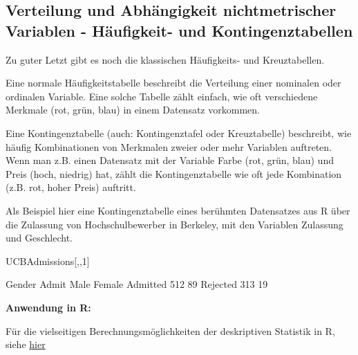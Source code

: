 \documentclass[a4paper,twoside]{tufte-book}\usepackage[]{graphicx}\usepackage[]{color}
\begin{document}
\subsection{Verteilung und Abhängigkeit nichtmetrischer Variablen - Häufigkeit- und Kontingenztabellen}

Zu guter Letzt gibt es noch die klassischen Häufigkeits- und Kreuztabellen.

Eine normale Häufigkeitstabelle beschreibt die Verteilung einer nominalen oder ordinalen Variable. Eine solche Tabelle zählt einfach, wie oft verschiedene Merkmale (rot, grün, blau) in einem Datensatz vorkommen. 

Eine Kontingenztabelle (auch: Kontingenztafel oder Kreuztabelle) beschreibt, wie häufig Kombinationen von Merkmalen zweier oder mehr Variablen auftreten. Wenn man z.B. einen Datensatz mit der Variable Farbe (rot, grün, blau) und Preis (hoch, niedrig) hat, zählt die Kontingenztabelle wie oft jede Kombination (z.B. rot, hoher Preis) auftritt. 

Als Beispiel hier eine Kontingenztabelle eines berühmten Datensatzes aus R über die Zulassung von Hochschulbewerber in Berkeley, mit den Variablen Zulassung und Geschlecht. 

\begin{Schunk}
\begin{Sinput}
UCBAdmissions[,,1]
\end{Sinput}
\begin{Soutput}
          Gender
Admit      Male Female
  Admitted  512     89
  Rejected  313     19
\end{Soutput}
\end{Schunk}


\vspace{1cm}
\begin{fullwidth}
\begin{mdframed}[backgroundcolor=black!10,rightline=false,leftline=false]
    
\textbf{Anwendung in R:} 

Für die vielseitigen Berechnungsmöglichkeiten der deskriptiven Statistik in R, siehe \href{http://www.uni-kiel.de/psychologie/rexrepos/rerDescriptive.html}{hier}

\end{mdframed}
\end{fullwidth} 
\end{document}
